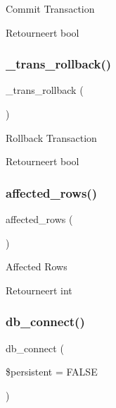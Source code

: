 Commit Transaction

\begin{DoxyReturn}{Retourneert}
bool 
\end{DoxyReturn}
\mbox{\label{class_c_i___d_b__cubrid__driver_ad49a116b0776c26b53114c9093fd102a}} 
\subsubsection{\texorpdfstring{\_trans\_rollback()}{\_trans\_rollback()}}
{\footnotesize\ttfamily \+\_\+trans\+\_\+rollback (\begin{DoxyParamCaption}{ }\end{DoxyParamCaption})\hspace{0.3cm}{\ttfamily [protected]}}

Rollback Transaction

\begin{DoxyReturn}{Retourneert}
bool 
\end{DoxyReturn}
\mbox{\label{class_c_i___d_b__cubrid__driver_a77248aaad33eb132c04cc4aa3f4bc8cb}} 
\subsubsection{\texorpdfstring{affected\_rows()}{affected\_rows()}}
{\footnotesize\ttfamily affected\+\_\+rows (\begin{DoxyParamCaption}{ }\end{DoxyParamCaption})}

Affected Rows

\begin{DoxyReturn}{Retourneert}
int 
\end{DoxyReturn}
\mbox{\label{class_c_i___d_b__cubrid__driver_a52bf595e79e96cc0a7c907a9b45aeb4d}} 
\subsubsection{\texorpdfstring{db\_connect()}{db\_connect()}}
{\footnotesize\ttfamily db\+\_\+connect (\begin{DoxyParamCaption}\item[{}]{\$persistent = {\ttfamily FALSE} }\end{DoxyParamCaption})}

